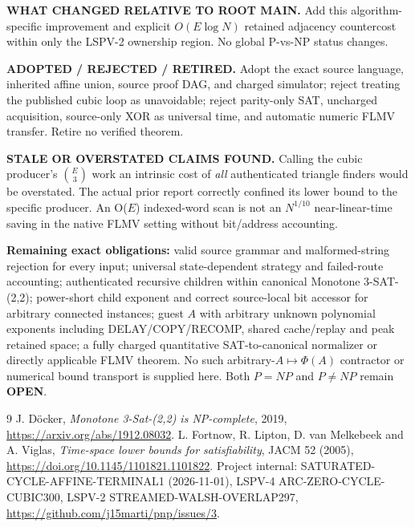 \documentclass[11pt]{article}
\begin{document}
\noindent\textbf{WHAT CHANGED RELATIVE TO ROOT MAIN.} Add this algorithm-specific improvement and explicit $O(E\log N)$ retained adjacency countercost within only the LSPV-2 ownership region. No global P-vs-NP status changes.\par
\noindent\textbf{ADOPTED / REJECTED / RETIRED.} Adopt the exact source language, inherited affine union, source proof DAG, and charged simulator; reject treating the published cubic loop as unavoidable; reject parity-only SAT, uncharged acquisition, source-only XOR as universal time, and automatic numeric FLMV transfer. Retire no verified theorem.\par
\noindent\textbf{STALE OR OVERSTATED CLAIMS FOUND.} Calling the cubic producer's $\binom E3$ work an intrinsic cost of \emph{all} authenticated triangle finders would be overstated. The actual prior report correctly confined its lower bound to the specific producer. An O($E$) indexed-word scan is not an $N^{1/10}$ near-linear-time saving in the native FLMV setting without bit/address accounting.

\noindent\textbf{Remaining exact obligations:} valid source grammar and malformed-string rejection for every input; universal state-dependent strategy and failed-route accounting; authenticated recursive children within canonical Monotone 3-SAT-(2,2); power-short child exponent and correct source-local bit accessor for arbitrary connected instances; guest $A$ with arbitrary unknown polynomial exponents including DELAY/COPY/RECOMP, shared cache/replay and peak retained space; a fully charged quantitative SAT-to-canonical normalizer or directly applicable FLMV theorem. No such arbitrary-$A\mapsto\Phi(A)$ contractor or numerical bound transport is supplied here. Both $P=NP$ and $P\ne NP$ remain \textbf{OPEN}.

\begin{thebibliography}{9}
 J. D\"ocker, \emph{Monotone 3-Sat-(2,2) is NP-complete}, 2019, \url{https://arxiv.org/abs/1912.08032}.
 L. Fortnow, R. Lipton, D. van Melkebeek and A. Viglas, \emph{Time-space lower bounds for satisfiability}, JACM 52 (2005), \url{https://doi.org/10.1145/1101821.1101822}.
 Project internal: SATURATED-CYCLE-AFFINE-TERMINAL1 (2026-11-01), LSPV-4 ARC-ZERO-CYCLE-CUBIC300, LSPV-2 STREAMED-WALSH-OVERLAP297, \url{https://github.com/j15marti/pnp/issues/3}.
\end{thebibliography}
\end{document}
